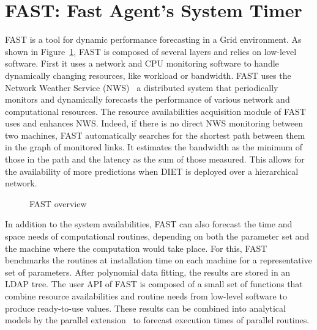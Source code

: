 

\section{FAST: Fast Agent's System Timer}
\label{sec:FAST}

FAST \cite{Qui02} is a tool for dynamic performance forecasting in a
Grid environment. As shown in Figure~\ref{fig:fast-overview}, FAST is
composed of several layers and relies on low-level software. First it
uses a network and CPU monitoring software to handle dynamically
changing resources, like workload or bandwidth.  FAST uses the Network
Weather Service (NWS)~\cite{WSH99} a distributed system that
periodically monitors and dynamically forecasts the performance of
various network and computational resources. The resource
availabilities acquisition module of FAST uses and enhances NWS.
Indeed, if there is no direct NWS monitoring between two machines,
FAST automatically searches for the shortest path between them in the
graph of monitored links. It estimates the bandwidth as the minimum of
those in the path and the latency as the sum of those measured. This
allows for the availability of more predictions when DIET is deployed
over a hierarchical network.

\begin{figure}[htb]
  \begin{center}
    \caption{FAST overview}
    \label{fig:fast-overview}
  \end{center}
\end{figure}

In addition to the system availabilities, FAST can also forecast the time and
space needs of computational routines, depending on both the parameter set and
the machine where the computation would take place.  For this, FAST 
benchmarks the routines at installation time on each machine for a
representative set of parameters. After polynomial data fitting, the results
are stored in an LDAP tree.  The user API of FAST is composed of a small set
of functions that combine resource availabilities and routine needs from
low-level software to produce ready-to-use values. These results can be
combined into analytical models by the parallel extension~\cite{CS02} to
forecast execution times of parallel routines.

